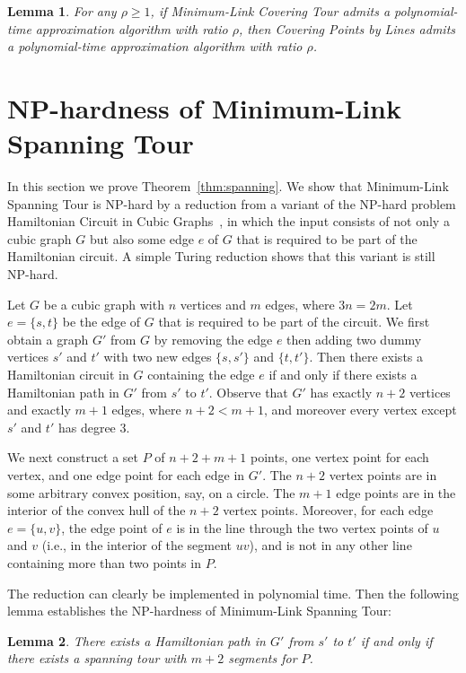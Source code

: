 \documentclass[letterpaper,11pt]{article}
\newtheorem{lemma}{Lemma}
\def\ie{{i.e.}}
\begin{document}
\begin{lemma}\label{lem:covering}
For any $\rho \ge 1$,
if {\sc Minimum-Link Covering Tour} admits a polynomial-time approximation algorithm
with ratio $\rho$,
then {\sc Covering Points by Lines} admits a polynomial-time approximation algorithm
with ratio $\rho$.
\end{lemma}


\section{NP-hardness of {\sc Minimum-Link Spanning Tour}}

In this section we prove Theorem~\ref{thm:spanning}.
We show that {\sc Minimum-Link Spanning Tour} is NP-hard by a reduction from
a variant of the NP-hard problem
{\sc Hamiltonian Circuit in Cubic Graphs}~\cite{GJS74},
in which the input consists of not only a cubic graph $G$
but also some edge $e$ of $G$ that is required to be part of the Hamiltonian
circuit.
A simple Turing reduction shows that this variant is still NP-hard.

Let $G$ be a cubic graph with $n$ vertices and $m$ edges, where $3n = 2m$.
Let $e = \{s,t\}$ be the edge of $G$ that is required to be part of the circuit.
We first obtain a graph $G'$ from $G$ by removing the edge $e$
then adding two dummy vertices $s'$ and $t'$ with two new edges
$\{s, s'\}$ and $\{t, t'\}$.
Then there exists a Hamiltonian circuit in $G$ containing the edge $e$
if and only if
there exists a Hamiltonian path in $G'$ from $s'$ to $t'$.
Observe that $G'$ has exactly $n+2$ vertices and exactly $m+1$ edges,
where $n+2 < m+1$,
and moreover every vertex except $s'$ and $t'$ has degree $3$.

We next construct a set $P$ of $n+2+m+1$ points,
one vertex point for each vertex,
and one edge point for each edge in $G'$.
The $n+2$ vertex points are in some arbitrary convex position,
say, on a circle.
The $m+1$ edge points are in the interior of the convex hull
of the $n+2$ vertex points.
Moreover, for each edge $e = \{ u, v \}$,
the edge point of $e$ is in the line through the two vertex points
of $u$ and $v$ (\ie, in the interior of the segment $uv$),
and is not in any other line containing more than two points in $P$.

The reduction can clearly be implemented in polynomial time.
Then the following lemma establishes the NP-hardness
of {\sc Minimum-Link Spanning Tour}:

\begin{lemma}
There exists a Hamiltonian path in $G'$ from $s'$ to $t'$
if and only if
there exists a spanning tour with $m+2$ segments for $P$.
\end{lemma}
\end{document}

